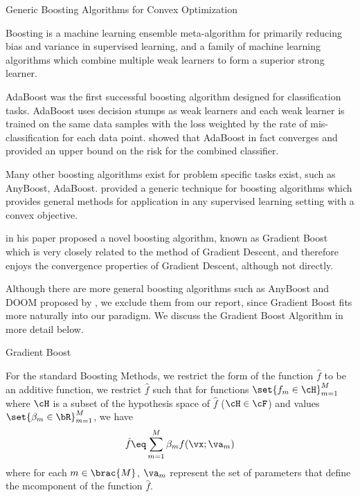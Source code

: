 \documentclass{article}
\begin{document}
\begin{psection}{Generic Boosting Algorithms for Convex Optimization}

	\begin{definition}[Boosting]
		Boosting is a machine learning ensemble meta-algorithm for primarily reducing bias and variance \citep{boost-var} in supervised learning, and a family of machine learning algorithms which combine multiple weak learners to form a superior strong learner.
	\end{definition}

	AdaBoost \citep{adaboost} was the first successful boosting algorithm designed for classification tasks. AdaBoost uses decision stumps as weak learners and each weak learner is trained on the same data samples with the loss weighted by the rate of mis-classification for each data point. \cite{adaboost} showed that AdaBoost in fact converges and provided an upper bound on the risk for the combined classifier.

	Many other boosting algorithms exist for problem specific tasks exist, such as AnyBoost, AdaBoost. \cite{gbm} provided a generic technique for boosting algorithms which provides general methods for application in any supervised learning setting with a convex objective.

	 in his paper proposed a novel boosting algorithm, known as Gradient Boost which is very closely related to the method of Gradient Descent, and therefore enjoys the convergence properties of Gradient Descent, although not directly.

	Although there are more general boosting algorithms such as AnyBoost and DOOM proposed by \cite{anyboost}, we exclude them from our report, since Gradient Boost fits more naturally into our paradigm. We discuss the Gradient Boost Algorithm in more detail below.

	\begin{psubsection}{Gradient Boost}

		For the standard Boosting Methods, we restrict the form of the function $\hat{f}$ to be an additive function, \ie we restrict $\hat{f}$ such that for functions $\set{f_m \in \cH}_{m = 1}^M$ where $\cH$ is a subset of the hypothesis space of $\hat{f}$ ($\cH \in \cF$) and values $\set{\beta_m \in \bR}_{m = 1}^M$, we have
		\begin{equation}
			\hat{f} \eq \sum_{m = 1}^M \beta_m f(\vx; \va_m)
		\end{equation}
		where for each $m \in \brac{M}$, $\va_m$ represent the set of parameters that define the m\tth component of the function $\hat{f}$.


\end{psubsection}
\end{psection}
\end{document}
